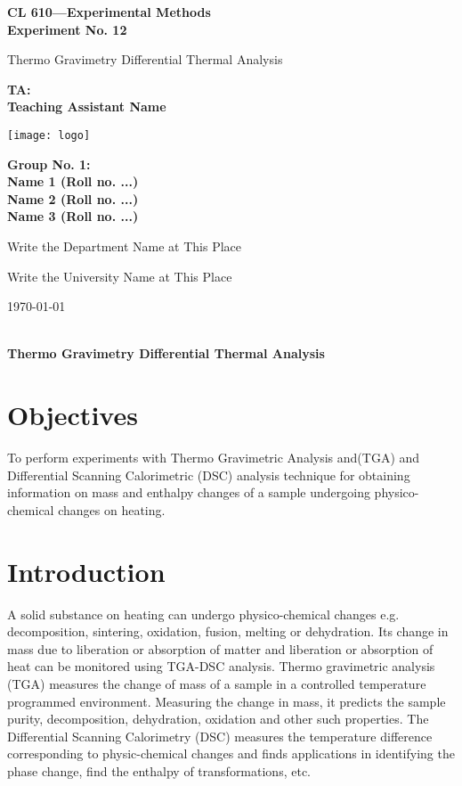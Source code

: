 \documentclass[11pt, a4paper]{article}
\newcommand{\Title}[1]{{\LARGE \centering \hrulefill\\ \textbf{#1}\\ \hrulefill}}
\begin{document}
	
\doublespacing
\begin{titlepage}	
	\centering 	
	{\LARGE \bfseries 
		CL 610---Experimental Methods\\[2mm]
		Experiment No. 12
	}
	\vspace{1\baselineskip}
	
	{\Large Thermo Gravimetry Differential Thermal Analysis}
	\vspace{2.5\baselineskip}
	
	{\Large \bfseries 
		TA:\\[1mm]	Teaching Assistant Name
	}
	\vspace{2.5\baselineskip}
	
	\texttt{[image: logo]}
	\vspace{2.5\baselineskip}
	
	{\Large \bfseries \onehalfspacing
		Group No. 1:\\[1mm] 
		Name 1 (Roll no. ...)\\ 
		Name 2  (Roll no. ...)\\ 
		Name 3  (Roll no. ...)\\
	}
	\vspace{3\baselineskip}
	
	{\Large Write the Department Name at This Place}
	\vspace{0.2\baselineskip}
	
	{\Large Write the University Name at This Place}
	\vspace{3\baselineskip}
	
	{\Large \today}    	
\end{titlepage}		

\Title{Thermo Gravimetry Differential Thermal Analysis}	
\onehalfspacing
	
\section{Objectives}
To perform experiments with Thermo Gravimetric Analysis and(TGA) and Differential Scanning Calorimetric (DSC) analysis technique for obtaining information on mass and enthalpy changes of a sample undergoing physico-chemical changes on heating.

\section{Introduction}
A solid substance on heating can undergo physico-chemical changes e.g. decomposition, sintering, oxidation, fusion, melting or dehydration. Its change in mass due to
liberation or absorption of matter and liberation or absorption of heat can be monitored using TGA-DSC analysis. Thermo gravimetric analysis (TGA) measures the change of mass of a sample in a controlled temperature programmed environment. Measuring the change in mass, it predicts the sample purity, decomposition, dehydration, oxidation and other such properties. The Differential Scanning Calorimetry (DSC) measures the temperature difference corresponding to physic-chemical changes and finds applications in identifying the phase change, find the enthalpy of transformations, etc.
\end{document}
